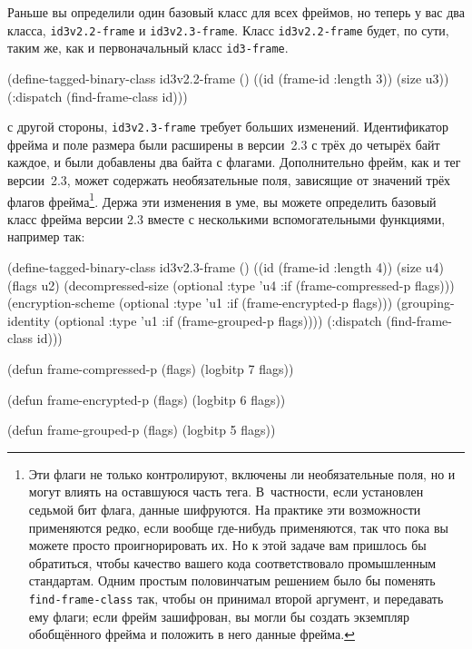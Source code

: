Раньше вы определили один базовый класс для всех фреймов, но теперь у вас два класса,
\lstinline{id3v2.2-frame} и \lstinline{id3v2.3-frame}. Класс \lstinline{id3v2.2-frame} будет, по сути,
таким же, как и первоначальный класс \lstinline{id3-frame}.

\begin{myverb}
(define-tagged-binary-class id3v2.2-frame ()
  ((id (frame-id :length 3))
   (size u3))
  (:dispatch (find-frame-class id)))
\end{myverb}

с другой стороны, \lstinline{id3v2.3-frame} требует больших изменений. Идентификатор
фрейма и поле размера были расширены в версии~2.3 с трёх до четырёх байт каждое, и были
добавлены два байта с флагами. Дополнительно фрейм, как и тег версии~2.3, может содержать
необязательные поля, зависящие от значений трёх флагов фрейма\footnote{Эти флаги не только
  контролируют, включены ли необязательные поля, но и могут влиять на оставшуюся часть
  тега. В~частности, если установлен седьмой бит флага, данные шифруются. На практике эти
  возможности применяются редко, если вообще где-нибудь применяются, так что пока вы
  можете просто проигнорировать их. Но к этой задаче вам пришлось бы обратиться, чтобы
  качество вашего кода соответствовало промышленным стандартам. Одним простым половинчатым
  решением было бы поменять \lstinline{find-frame-class} так, чтобы он принимал второй
  аргумент, и передавать ему флаги; если фрейм зашифрован, вы могли бы создать экземпляр
  обобщённого фрейма и положить в него данные фрейма.}\hspace{\footnotenegspace}. Держа
эти изменения в уме, вы можете определить базовый класс фрейма версии 2.3 вместе с
несколькими вспомогательными функциями, например так:

\begin{myverb}
(define-tagged-binary-class id3v2.3-frame ()
  ((id                (frame-id :length 4))
   (size              u4)
   (flags             u2)
   (decompressed-size (optional :type 'u4 :if (frame-compressed-p flags)))
   (encryption-scheme (optional :type 'u1 :if (frame-encrypted-p flags)))
   (grouping-identity (optional :type 'u1 :if (frame-grouped-p flags))))
  (:dispatch (find-frame-class id)))

(defun frame-compressed-p (flags) (logbitp 7 flags))

(defun frame-encrypted-p (flags) (logbitp 6 flags))

(defun frame-grouped-p (flags) (logbitp 5 flags))
\end{myverb}

